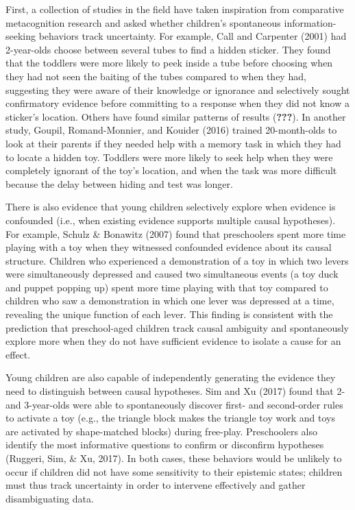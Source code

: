 \documentclass[a4paper,man,apacite,floatsintext]{apa6}
\begin{document}
First, a collection of studies in the field have taken inspiration from
comparative metacognition research and asked whether children's
spontaneous information-seeking behaviors track uncertainty. For
example, Call and Carpenter (2001) had 2-year-olds choose between
several tubes to find a hidden sticker. They found that the toddlers
were more likely to peek inside a tube before choosing when they had not
seen the baiting of the tubes compared to when they had, suggesting they
were aware of their knowledge or ignorance and selectively sought
confirmatory evidence before committing to a response when they did not
know a sticker's location. Others have found similar patterns of results
({\textbf{???}}). In another study, Goupil, Romand-Monnier, and Kouider
(2016) trained 20-month-olds to look at their parents if they needed
help with a memory task in which they had to locate a hidden toy.
Toddlers were more likely to seek help when they were completely
ignorant of the toy's location, and when the task was more difficult
because the delay between hiding and test was longer.

There is also evidence that young children selectively explore when
evidence is confounded (i.e., when existing evidence supports multiple
causal hypotheses). For example, Schulz \& Bonawitz (2007) found that
preschoolers spent more time playing with a toy when they witnessed
confounded evidence about its causal structure. Children who experienced
a demonstration of a toy in which two levers were simultaneously
depressed and caused two simultaneous events (a toy duck and puppet
popping up) spent more time playing with that toy compared to children
who saw a demonstration in which one lever was depressed at a time,
revealing the unique function of each lever. This finding is consistent
with the prediction that preschool-aged children track causal ambiguity
and spontaneously explore more when they do not have sufficient evidence
to isolate a cause for an effect.

Young children are also capable of independently generating the evidence
they need to distinguish between causal hypotheses. Sim and Xu (2017)
found that 2- and 3-year-olds were able to spontaneously discover first-
and second-order rules to activate a toy (e.g., the triangle block makes
the triangle toy work and toys are activated by shape-matched blocks)
during free-play. Preschoolers also identify the most informative
questions to confirm or disconfirm hypotheses (Ruggeri, Sim, \& Xu,
2017). In both cases, these behaviors would be unlikely to occur if
children did not have some sensitivity to their epistemic states;
children must thus track uncertainty in order to intervene effectively
and gather disambiguating data.
\end{document}
